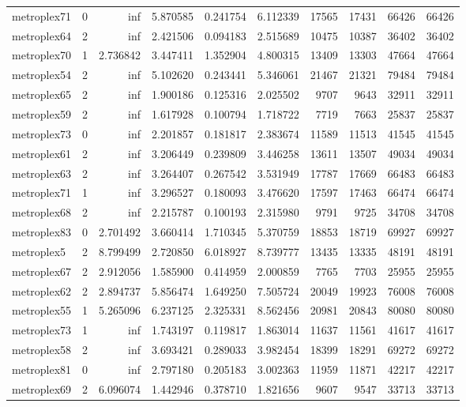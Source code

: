 \begin{longtable}{|l|r|r|r|r|r|r|r|r|r|}
metroplex71 & 0 & inf & 5.870585 & 0.241754 & 6.112339 & 17565 & 17431 & 66426 & 66426 \\
metroplex64 & 2 & inf & 2.421506 & 0.094183 & 2.515689 & 10475 & 10387 & 36402 & 36402 \\
metroplex70 & 1 & 2.736842 & 3.447411 & 1.352904 & 4.800315 & 13409 & 13303 & 47664 & 47664 \\
metroplex54 & 2 & inf & 5.102620 & 0.243441 & 5.346061 & 21467 & 21321 & 79484 & 79484 \\
metroplex65 & 2 & inf & 1.900186 & 0.125316 & 2.025502 & 9707 & 9643 & 32911 & 32911 \\
metroplex59 & 2 & inf & 1.617928 & 0.100794 & 1.718722 & 7719 & 7663 & 25837 & 25837 \\
metroplex73 & 0 & inf & 2.201857 & 0.181817 & 2.383674 & 11589 & 11513 & 41545 & 41545 \\
metroplex61 & 2 & inf & 3.206449 & 0.239809 & 3.446258 & 13611 & 13507 & 49034 & 49034 \\
metroplex63 & 2 & inf & 3.264407 & 0.267542 & 3.531949 & 17787 & 17669 & 66483 & 66483 \\
metroplex71 & 1 & inf & 3.296527 & 0.180093 & 3.476620 & 17597 & 17463 & 66474 & 66474 \\
metroplex68 & 2 & inf & 2.215787 & 0.100193 & 2.315980 & 9791 & 9725 & 34708 & 34708 \\
metroplex83 & 0 & 2.701492 & 3.660414 & 1.710345 & 5.370759 & 18853 & 18719 & 69927 & 69927 \\
metroplex5 & 2 & 8.799499 & 2.720850 & 6.018927 & 8.739777 & 13435 & 13335 & 48191 & 48191 \\
metroplex67 & 2 & 2.912056 & 1.585900 & 0.414959 & 2.000859 & 7765 & 7703 & 25955 & 25955 \\
metroplex62 & 2 & 2.894737 & 5.856474 & 1.649250 & 7.505724 & 20049 & 19923 & 76008 & 76008 \\
metroplex55 & 1 & 5.265096 & 6.237125 & 2.325331 & 8.562456 & 20981 & 20843 & 80080 & 80080 \\
metroplex73 & 1 & inf & 1.743197 & 0.119817 & 1.863014 & 11637 & 11561 & 41617 & 41617 \\
metroplex58 & 2 & inf & 3.693421 & 0.289033 & 3.982454 & 18399 & 18291 & 69272 & 69272 \\
metroplex81 & 0 & inf & 2.797180 & 0.205183 & 3.002363 & 11959 & 11871 & 42217 & 42217 \\
metroplex69 & 2 & 6.096074 & 1.442946 & 0.378710 & 1.821656 & 9607 & 9547 & 33713 & 33713 \\

\end{longtable}
